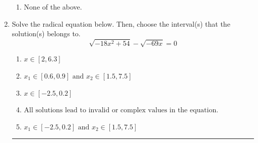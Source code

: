 \documentclass[14pt]{extbook}
\newcommand{\litem}[1]{\item#1\hspace*{-1cm}\rule{\textwidth}{0.4pt}}
\begin{document}
\begin{enumerate}
{\begin{enumerate}[label=\Alph*.]
\item None of the above.
\end{enumerate} }
\litem{
Solve the radical equation below. Then, choose the interval(s) that the solution(s) belongs to.\[ \sqrt{-18 x^2 + 54} - \sqrt{-69 x} = 0 \]\begin{enumerate}[label=\Alph*.]
\item \( x \in [2,6.3] \)
\item \( x_1 \in [0.6, 0.9] \text{ and } x_2 \in [1.5,7.5] \)
\item \( x \in [-2.5,0.2] \)
\item \( \text{All solutions lead to invalid or complex values in the equation.} \)
\item \( x_1 \in [-2.5, 0.2] \text{ and } x_2 \in [1.5,7.5] \)


\end{enumerate}}
\end{enumerate}
\end{document}

